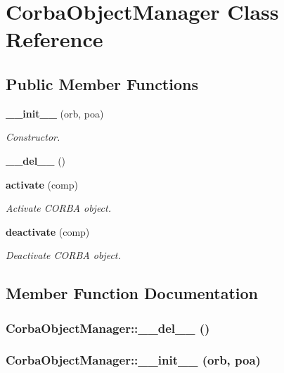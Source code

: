 \section{Corba\-Object\-Manager Class Reference}
\label{classCorbaObjectManager}
\subsection*{Public Member Functions}
\begin{CompactItemize}
\item 
{\bf \_\-\_\-init\_\-\_\-} (orb, poa)
\begin{CompactList}\small\item\em Constructor. \item\end{CompactList}\item 
{\bf \_\-\_\-del\_\-\_\-} ()
\item 
{\bf activate} (comp)
\begin{CompactList}\small\item\em Activate CORBA object. \item\end{CompactList}\item 
{\bf deactivate} (comp)
\begin{CompactList}\small\item\em Deactivate CORBA object. \item\end{CompactList}\end{CompactItemize}


\subsection{Member Function Documentation}
\subsubsection{\setlength{\rightskip}{0pt plus 5cm}Corba\-Object\-Manager::\_\-\_\-del\_\-\_\- ()}\label{classCorbaObjectManager_CorbaObjectManagera1}


\subsubsection{\setlength{\rightskip}{0pt plus 5cm}Corba\-Object\-Manager::\_\-\_\-init\_\-\_\- (orb, poa)}\label{classCorbaObjectManager_CorbaObjectManagera0}



